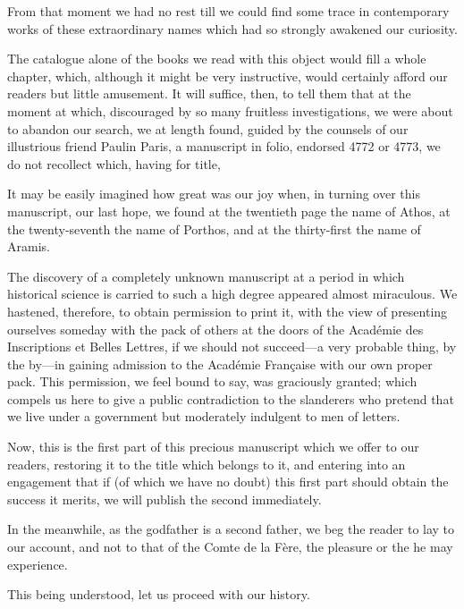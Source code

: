 From that moment we had no rest till we could find some trace in contemporary works of these extraordinary names which had so strongly awakened our curiosity. 

The catalogue alone of the books we read with this object would fill a whole chapter, which, although it might be very instructive, would certainly afford our readers but little amusement. It will suffice, then, to tell them that at the moment at which, discouraged by so many fruitless investigations, we were about to abandon our search, we at length found, guided by the counsels of our illustrious friend Paulin Paris, a manuscript in folio, endorsed 4772 or 4773, we do not recollect which, having for title, 

It may be easily imagined how great was our joy when, in turning over this manuscript, our last hope, we found at the twentieth page the name of Athos, at the twenty-seventh the name of Porthos, and at the thirty-first the name of Aramis. 

The discovery of a completely unknown manuscript at a period in which historical science is carried to such a high degree appeared almost miraculous. We hastened, therefore, to obtain permission to print it, with the view of presenting ourselves someday with the pack of others at the doors of the Académie des Inscriptions et Belles Lettres, if we should not succeed—a very probable thing, by the by—in gaining admission to the Académie Française with our own proper pack. This permission, we feel bound to say, was graciously granted; which compels us here to give a public contradiction to the slanderers who pretend that we live under a government but moderately indulgent to men of letters. 

Now, this is the first part of this precious manuscript which we offer to our readers, restoring it to the title which belongs to it, and entering into an engagement that if (of which we have no doubt) this first part should obtain the success it merits, we will publish the second immediately. 

In the meanwhile, as the godfather is a second father, we beg the reader to lay to our account, and not to that of the Comte de la Fère, the pleasure or the  he may experience. 

This being understood, let us proceed with our history.